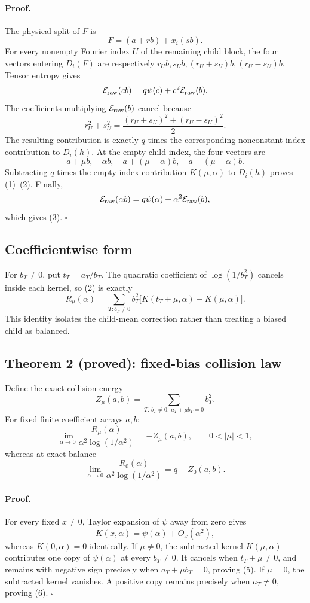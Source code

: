 \paragraph{Proof.}
The physical split of \(F\) is
\[
 F=(a+rb)+x_i(sb).
\]
For every nonempty Fourier index \(U\) of the remaining child block, the
four vectors entering \(D_i(F)\) are respectively
\(r_Ub,s_Ub,(r_U+s_U)b,(r_U-s_U)b\).  Tensor entropy gives
\[
 \mathcal E_{\rm raw}(cb)=q\psi(c)+c^2\mathcal E_{\rm raw}(b).
\]
The coefficients multiplying \(\mathcal E_{\rm raw}(b)\) cancel because
\[
 r_U^2+s_U^2=\frac{(r_U+s_U)^2+(r_U-s_U)^2}{2}.
\]
The resulting contribution is exactly \(q\) times the corresponding
nonconstant-index contribution to \(D_i(h)\).  At the empty child index,
the four vectors are
\[
 a+\mu b,\quad \alpha b,\quad a+(\mu+\alpha)b,
 \quad a+(\mu-\alpha)b.
\]
Subtracting \(q\) times the empty-index contribution
\(K(\mu,\alpha)\) to \(D_i(h)\) proves (1)--(2).  Finally,
\[
 \mathcal E_{\rm raw}(\alpha b)
 =q\psi(\alpha)+\alpha^2\mathcal E_{\rm raw}(b),
\]
which gives (3). \(\square\)

\subsection*{Coefficientwise form}

For \(b_T\ne0\), put \(t_T=a_T/b_T\).  The quadratic coefficient of
\(\log(1/b_T^2)\) cancels inside each kernel, so (2) is exactly
\[
 \boxed{
 R_\mu(\alpha)=\sum_{T:b_T\ne0}b_T^2
 \bigl[K(t_T+\mu,\alpha)-K(\mu,\alpha)\bigr].}                    \tag{4}
\]
This identity isolates the child-mean correction rather than treating a
biased child as balanced.

\subsection*{Theorem 2 (proved): fixed-bias collision law}

Define the exact collision energy
\[
 Z_\mu(a,b)=\sum_{T:\,b_T\ne0,\ a_T+\mu b_T=0}b_T^2.
\]
For fixed finite coefficient arrays \(a,b\):
\[
 \lim_{\alpha\to0}
 \frac{R_\mu(\alpha)}{\alpha^2\log(1/\alpha^2)}
 =-Z_\mu(a,b),\qquad 0<|\mu|<1,                                  \tag{5}
\]
whereas at exact balance
\[
 \lim_{\alpha\to0}
 \frac{R_0(\alpha)}{\alpha^2\log(1/\alpha^2)}
 =q-Z_0(a,b).                                                       \tag{6}
\]

\paragraph{Proof.}
For every fixed \(x\ne0\), Taylor expansion of \(\psi\) away from zero
gives
\[
 K(x,\alpha)=\psi(\alpha)+O_x(\alpha^2),
\]
whereas \(K(0,\alpha)=0\) identically.  If \(\mu\ne0\), the subtracted
kernel \(K(\mu,\alpha)\) contributes one copy of \(\psi(\alpha)\) at
every \(b_T\ne0\).  It cancels when \(t_T+\mu\ne0\), and remains with
negative sign precisely when \(a_T+\mu b_T=0\), proving (5).  If
\(\mu=0\), the subtracted kernel vanishes.  A positive copy remains
precisely when \(a_T\ne0\), proving (6). \(\square\)

